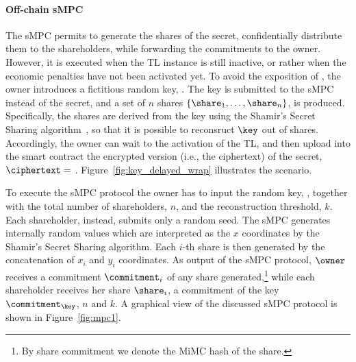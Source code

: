 \medskip

\paragraph*{Off-chain sMPC}\label{sect:impl_mpc_brief}
The sMPC permits to generate the shares of the secret, confidentially distribute them to the shareholders, while forwarding the commitments to the owner.
However, it is executed when the TL instance is still inactive, or rather when the economic penalties have not been activated yet. 
To avoid the exposition of \secret, the owner introduces a fictitious random key, \key.
The key is submitted to the sMPC instead of the secret, and a set of $n$ shares $\left\lbrace \share _1 , \ldots , \share_{n} 	\right\rbrace$, is produced.
Specifically, the shares are derived from the key using the Shamir's Secret Sharing algorithm~\cite{Shamir:1979:SS:359168.359176}, so that it is possible to reconsruct $\key$ out of \KofN shares.
Accordingly, the owner can wait to the activation of the TL, and then upload into the smart contract the encrypted version (i.e., the ciphertext) of the secret, $\ciphertext = $ \wrapsecret. 
Figure~\ref{fig:key_delayed_wrap} illustrates the scenario.

To execute the sMPC protocol the owner has to input the random key, \key, together with the total number of shareholders, $n$, and the reconstruction threshold, $k$. 
Each shareholder, instead, submits only a random seed.
The sMPC generates internally random values which are interpreted as the $x$ coordinates by the Shamir's Secret Sharing algorithm.
Each $i$-th share is then generated by the concatenation of $x_i$ and $y_i$ coordinates.
As output of the sMPC protocol, $\owner$ receives a commitment $\commitment _i$ of any share generated,\footnote{By share commitment we denote the MiMC hash of the share.} while each shareholder receives her share $\share_{i}$, a commitment of the key $ \commitment _ \key $, $n$ and $k$.
A graphical view of the discussed sMPC protocol is shown in Figure~\ref{fig:mpc1}.


